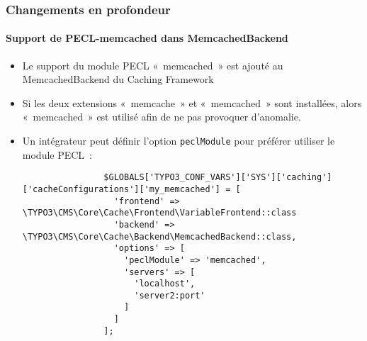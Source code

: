 \begin{frame}[fragile]
	\frametitle{Changements en profondeur}
	\framesubtitle{Support de PECL-memcached dans MemcachedBackend}

	\lstset{basicstyle=\tiny\ttfamily}

	\begin{itemize}

		\item Le support du module PECL «~memcached~» est ajouté au
			MemcachedBackend du Caching Framework

		\item Si les deux extensions «~memcache~» et «~memcached~» sont installées,
			alors «~memcached~» est utilisé afin de ne pas provoquer d'anomalie.

		\item Un intégrateur peut définir l'option \texttt{peclModule} pour préférer
			utiliser le module PECL~:

			\begin{lstlisting}
				$GLOBALS['TYPO3_CONF_VARS']['SYS']['caching']['cacheConfigurations']['my_memcached'] = [
				  'frontend' => \TYPO3\CMS\Core\Cache\Frontend\VariableFrontend::class
				  'backend' => \TYPO3\CMS\Core\Cache\Backend\MemcachedBackend::class,
				  'options' => [
				    'peclModule' => 'memcached',
				    'servers' => [
				      'localhost',
				      'server2:port'
				    ]
				  ]
				];
			\end{lstlisting}

	\end{itemize}

\end{frame}


